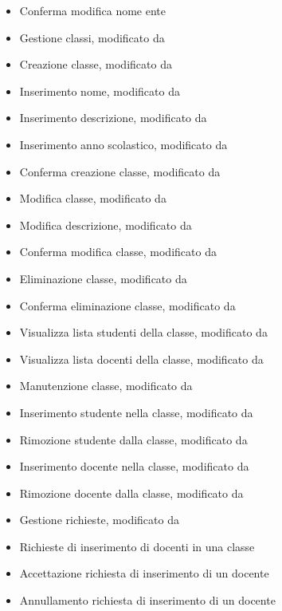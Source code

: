 \begin{itemize}
	\item {} Conferma modifica nome ente
	\item {} Gestione classi, modificato da 
	\item {} Creazione classe, modificato da 
	\item {} Inserimento nome, modificato da 
	\item {} Inserimento descrizione, modificato da 
	\item {} Inserimento anno scolastico, modificato da 
	\item {} Conferma creazione classe, modificato da 
	\item {} Modifica classe, modificato da 
	\item {} Modifica descrizione, modificato da 
	\item {} Conferma modifica classe, modificato da 
	\item {} Eliminazione classe, modificato da 
	\item {} Conferma eliminazione classe, modificato da 
	\item {} Visualizza lista studenti della classe, modificato da 
	\item {} Visualizza lista docenti della classe, modificato da 
	\item {} Manutenzione classe, modificato da 
	\item {} Inserimento studente nella classe, modificato da 
	\item {} Rimozione studente dalla classe, modificato da 
	\item {} Inserimento docente nella classe, modificato da 
	\item {} Rimozione docente dalla classe, modificato da 
	\item {} Gestione richieste, modificato da 
	\item {} Richieste di inserimento di docenti in una classe
	\item {} Accettazione richiesta di inserimento di un docente
	\item {} Annullamento richiesta di inserimento di un docente

\end{itemize}
